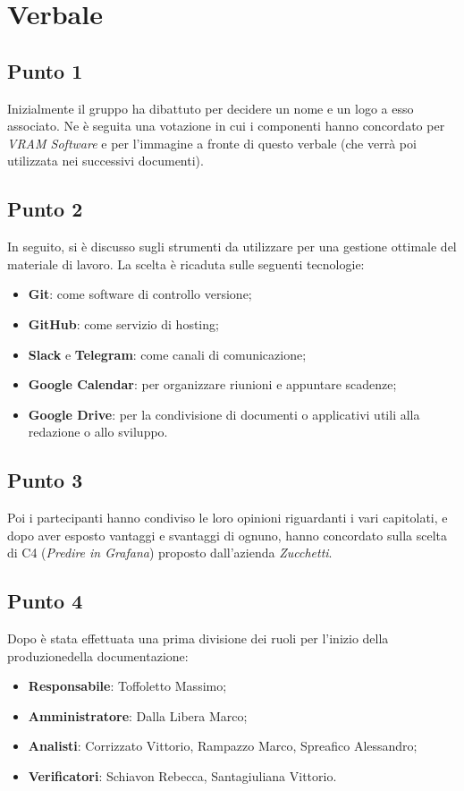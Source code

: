 \section{Verbale}
    \subsection{Punto 1}
        Inizialmente il gruppo ha dibattuto per decidere un nome e un logo a esso associato. Ne è seguita una votazione in cui i componenti hanno
        concordato per \textit{VRAM Software} e per l'immagine a fronte di questo verbale (che verrà poi utilizzata nei successivi documenti).
    \subsection{Punto 2}
        In seguito, si è discusso sugli strumenti da utilizzare per una gestione ottimale del materiale di lavoro. La scelta è ricaduta sulle seguenti tecnologie:
        \begin{itemize}
            \item \textbf{Git}: come software di controllo versione;
            \item \textbf{GitHub}: come servizio di hosting;
            \item \textbf{Slack} e \textbf{Telegram}: come canali di comunicazione;
            \item \textbf{Google Calendar}: per organizzare riunioni e appuntare scadenze;
            \item \textbf{Google Drive}: per la condivisione di documenti o applicativi utili alla redazione o allo sviluppo.
        \end{itemize}
    \subsection{Punto 3}
        Poi i partecipanti hanno condiviso le loro opinioni riguardanti i vari capitolati\glo, e dopo aver esposto vantaggi e svantaggi di ognuno, hanno concordato sulla scelta di C4 (\textit{Predire in Grafana}\glo) proposto dall'azienda \textit{Zucchetti}.
    \subsection{Punto 4}
        Dopo è stata effettuata una prima divisione dei ruoli per l'inizio della produzione\glosp della documentazione:
        \begin{itemize}
            \item \textbf{Responsabile}: Toffoletto Massimo;
            \item \textbf{Amministratore}: Dalla Libera Marco;
            \item \textbf{Analisti}: Corrizzato Vittorio, Rampazzo Marco, Spreafico Alessandro;
            \item \textbf{Verificatori}: Schiavon Rebecca, Santagiuliana Vittorio.
        \end{itemize}
